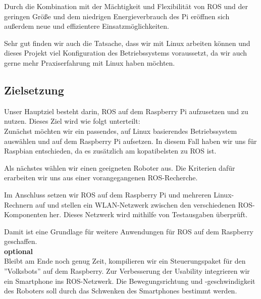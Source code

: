 \documentclass[12pt]{article}
\begin{document}
Durch die Kombination mit der Mächtigkeit und Flexibilität von ROS und der geringen Größe und dem niedrigen Energieverbrauch des Pi eröffnen sich außerdem neue und effizientere Einsatzmöglichkeiten.

Sehr gut finden wir auch die Tatsache, dass wir mit Linux arbeiten können und dieses Projekt viel Konfiguration des Betriebssystems voraussetzt, da wir auch gerne mehr Praxiserfahrung mit Linux haben möchten.








\subsection{Zielsetzung}


Unser Hauptziel besteht darin, ROS auf dem Raspberry Pi aufzusetzen und zu nutzen. Dieses Ziel wird wie folgt unterteilt:\\

Zunächst möchten wir ein passendes, auf Linux basierendes Betriebssystem auswählen und auf dem Raspberry Pi aufsetzen. In diesem Fall haben wir uns für Raspbian entschieden, da es zusätzlich am kopatibelsten zu ROS ist.

Als nächstes wählen wir einen geeigneten Roboter aus. Die Kriterien dafür erarbeiten wir uns aus einer vorangegangenen ROS-Recherche.

Im Anschluss setzen wir ROS auf dem Raspberry Pi und mehreren Linux-Rechnern auf und stellen ein WLAN-Netzwerk zwischen den verschiedenen ROS-Komponenten her.
Dieses Netzwerk wird mithilfe von Testausgaben überprüft.

Damit ist eine Grundlage für weitere Anwendungen für ROS auf dem Raspberry geschaffen.\\

{\bf optional}\\

Bleibt am Ende noch genug Zeit, kompilieren wir ein Steuerungspaket für den ''Volksbots'' auf dem Raspberry. Zur Verbesserung der Usability integrieren wir ein Smartphone ins ROS-Netzwerk. Die Bewegungsrichtung und -geschwindigkeit des Roboters soll durch das Schwenken des Smartphones bestimmt werden.
\end{document}
